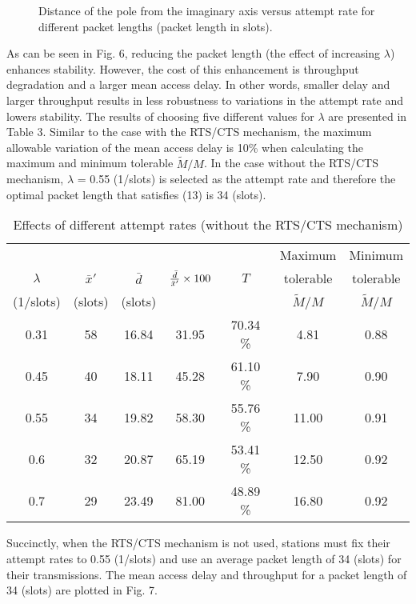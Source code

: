 \documentclass[10pt,twocolumn,oneside,submit]{JCNtran}
\begin{document}
\begin{figure}[h!tb]
\begin{center}
\epsfxsize=8cm \leavevmode{} \caption{Distance of the pole from the imaginary axis versus attempt rate for different packet lengths (packet length in slots).} \label{fig:6}
\end{center}
\end{figure}
\par As can be seen in Fig. 6, reducing the packet length (the effect of increasing $\lambda $) enhances stability. However, the cost of this enhancement is throughput degradation and a larger mean access delay. In other words, smaller delay and larger throughput results in less robustness to variations in the attempt rate and lowers stability. The results of choosing five different values for $\lambda $ are presented in Table 3. Similar to the case with the RTS/CTS mechanism, the maximum allowable variation of the mean access delay is 10\% when calculating the maximum and minimum tolerable $\tilde {M}/M$. In the case without the RTS/CTS mechanism, $\lambda $ = 0.55 (1/slots) is selected as the attempt rate and therefore the optimal packet length that satisfies (13) is 34 (slots).
\begin{table*}
\caption{Effects of different attempt rates (without the RTS/CTS mechanism)}
\label{tab:tab3}
\begin{center}
{\small \begin{tabular}{|c|c|c|c|c|c|c|}\hline
 &  &  &  &   &  Maximum &  Minimum \\
$\lambda $ & $\bar x'$ & $\bar d$ & ${\bar d \over {\bar x'}} \times 100$ & $T$ &  tolerable &  tolerable \\
 (1/slots) & (slots) & (slots) & & & $\tilde M/M$ & $\tilde M/M$ \\ \hline
0.31 & 58 & 16.84 & 31.95 & 70.34 \% & 4.81 & 0.88 \\
0.45 & 40 & 18.11 & 45.28 & 61.10 \% & 7.90 & 0.90 \\
0.55 & 34 & 19.82 & 58.30 & 55.76 \% & 11.00 & 0.91 \\
0.6 & 32 & 20.87 & 65.19 & 53.41 \% & 12.50 & 0.92 \\
0.7 & 29 & 23.49 & 81.00 & 48.89 \% & 16.80 & 0.92 \\ \hline
\end{tabular}}
\end{center}
\end{table*}
\par Succinctly, when the RTS/CTS mechanism is not used, stations must fix their attempt rates to 0.55 (1/slots) and use an average packet length of 34 (slots) for their transmissions. The mean access delay and throughput for a packet length of 34 (slots) are plotted in Fig. 7.
\end{document}
